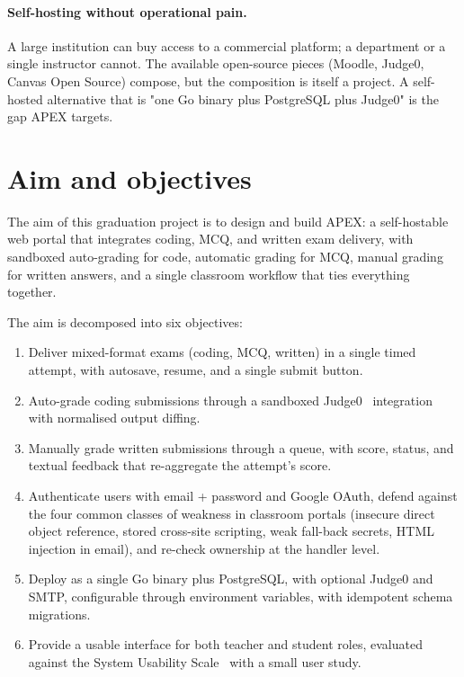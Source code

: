 \paragraph{Self-hosting without operational pain.} A large institution can buy access to a commercial platform; a department or a single instructor cannot. The available open-source pieces (Moodle, Judge0, Canvas Open Source) compose, but the composition is itself a project. A self-hosted alternative that is "one Go binary plus PostgreSQL plus Judge0" is the gap APEX targets.

\section{Aim and objectives}

The aim of this graduation project is to design and build APEX: a self-hostable web portal that integrates coding, MCQ, and written exam delivery, with sandboxed auto-grading for code, automatic grading for MCQ, manual grading for written answers, and a single classroom workflow that ties everything together.

The aim is decomposed into six objectives:

\begin{enumerate}
  \item[\textbf{O1}] Deliver mixed-format exams (coding, MCQ, written) in a single timed attempt, with autosave, resume, and a single submit button.
  \item[\textbf{O2}] Auto-grade coding submissions through a sandboxed Judge0~\cite{judge0,isolate} integration with normalised output diffing.
  \item[\textbf{O3}] Manually grade written submissions through a queue, with score, status, and textual feedback that re-aggregate the attempt's score.
  \item[\textbf{O4}] Authenticate users with email + password and Google OAuth, defend against the four common classes of weakness in classroom portals (insecure direct object reference, stored cross-site scripting, weak fall-back secrets, HTML injection in email), and re-check ownership at the handler level.
  \item[\textbf{O5}] Deploy as a single Go binary plus PostgreSQL, with optional Judge0 and SMTP, configurable through environment variables, with idempotent schema migrations.
  \item[\textbf{O6}] Provide a usable interface for both teacher and student roles, evaluated against the System Usability Scale~\cite{brooke1996sus} with a small user study.
\end{enumerate}

